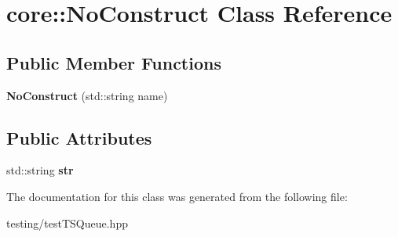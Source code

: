 \hypertarget{classcore_1_1_no_construct}{\section{core\-:\-:No\-Construct Class Reference}
\label{classcore_1_1_no_construct}
}
\subsection*{Public Member Functions}
\begin{DoxyCompactItemize}
\item 
\hypertarget{classcore_1_1_no_construct_ae5ed49c5053f3451c4ff7e551e8f9963}{{\bfseries No\-Construct} (std\-::string name)}\label{classcore_1_1_no_construct_ae5ed49c5053f3451c4ff7e551e8f9963}

\end{DoxyCompactItemize}
\subsection*{Public Attributes}
\begin{DoxyCompactItemize}
\item 
\hypertarget{classcore_1_1_no_construct_aa5a2fa4268b7d6c1f273e3767433d1f4}{std\-::string {\bfseries str}}\label{classcore_1_1_no_construct_aa5a2fa4268b7d6c1f273e3767433d1f4}

\end{DoxyCompactItemize}


The documentation for this class was generated from the following file\-:\begin{DoxyCompactItemize}
\item 
testing/test\-T\-S\-Queue.\-hpp\end{DoxyCompactItemize}

